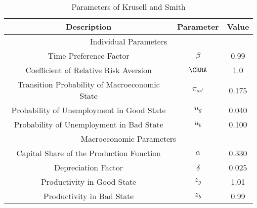 \begin{table}
\begin{center}
\caption{Parameters of Krusell and Smith}\label{table:parameters}
\begin{tabular}{|c|c|c|}
\hline 
Description                     & \multicolumn{1}{c}{Parameter} & Value  \\ \hline
\multicolumn{3}{|c|}{Individual Parameters}  \\ \hline
Time Preference Factor          & \multicolumn{1}{c}{$\beta$} & 0.99  \\
Coefficient of Relative Risk Aversion & \multicolumn{1}{c}{$\CRRA$} & 1.0  \\
Transition Probability of Macroeconomic State  & \multicolumn{1}{c}{$\pi_{ss'}$} & 0.175 \\
Probability of Unemployment in Good State  & \multicolumn{1}{c}{$u_g$} & 0.040 \\
 Probability of Unemployment in Bad State  & \multicolumn{1}{c}{$u_b$} & 0.100 \\
 \hline 
 \multicolumn{3}{|c|}{Macroeconomic Parameters}  \\ 
 \hline
 Capital Share of the Production Function & \multicolumn{1}{c}{$\alpha$} & 0.330 \\
 Depreciation Factor & \multicolumn{1}{c}{$\delta$} & 0.025 \\
 Productivity in Good State & \multicolumn{1}{c}{$z_g$} & 1.01 \\
 Productivity in Bad State & \multicolumn{1}{c}{$z_b$} & 0.99 \\
\hline
\end{tabular}
\end{center}
\end{table}
